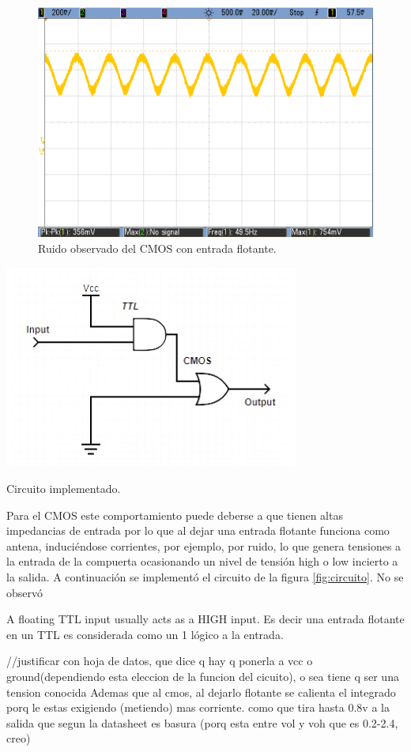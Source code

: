 \begin{figure}[H]
    \centering
    \includegraphics[width=.5\linewidth]{./ruidoCMOS.png}
    \caption{Ruido observado del CMOS con entrada flotante.}
    \label{fig:ruidoCMOS}
\end{figure}

\vspace{20mm}
\begin{table}
    \begin{center}
        \includegraphics[scale=0.5]{./circuito.jpg}
        \caption{Circuito implementado.}
        \label{fig:circuito}
    \end{center}
\end{table} 
\par
Para el CMOS este comportamiento puede deberse a que tienen altas impedancias de entrada por lo que al dejar una entrada flotante
funciona como antena, induciéndose corrientes, por ejemplo, por ruido, lo que genera tensiones a la entrada de la compuerta
ocasionando un nivel de tensión high o low incierto a la salida.
A continuación se implementó el circuito de la figura \ref{fig:circuito}. No se observó 



A floating TTL input usually acts as a HIGH input.
Es decir una entrada flotante en un TTL es considerada como un 1 lógico a la entrada.

//justificar con hoja de datos, que dice q hay q ponerla a vcc o ground(dependiendo esta eleccion de la funcion del cicuito), o sea tiene q ser una tension conocida
Ademas que al cmos, al dejarlo flotante se calienta el integrado porq le estas exigiendo (metiendo) mas corriente.
como que tira hasta 0.8v a la salida que segun la datasheet es basura (porq esta entre vol y voh que es 0.2-2.4, creo)

